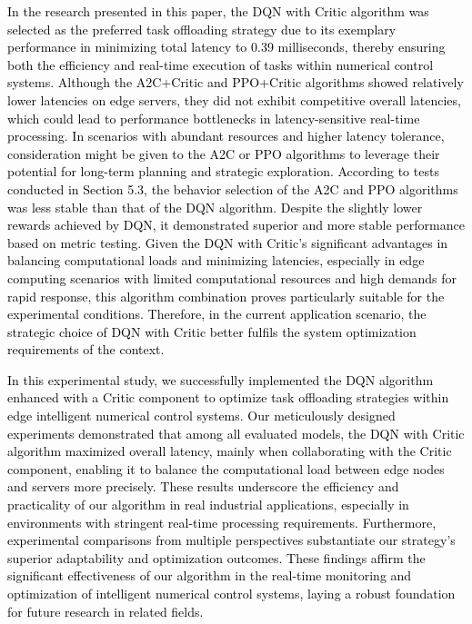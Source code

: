 \documentclass[preprint,12pt]{elsarticle}
\begin{document}
\textcolor{black}{In the research presented in this paper, the DQN with Critic algorithm was selected as the preferred task offloading strategy due to its exemplary performance in minimizing total latency to 0.39 milliseconds, thereby ensuring both the efficiency and real-time execution of tasks within numerical control systems. Although the A2C+Critic and PPO+Critic algorithms showed relatively lower latencies on edge servers, they did not exhibit competitive overall latencies, which could lead to performance bottlenecks in latency-sensitive real-time processing. In scenarios with abundant resources and higher latency tolerance, consideration might be given to the A2C or PPO algorithms to leverage their potential for long-term planning and strategic exploration. According to tests conducted in Section 5.3, the behavior selection of the A2C and PPO algorithms was less stable than that of the DQN algorithm. Despite the slightly lower rewards achieved by DQN, it demonstrated superior and more stable performance based on metric testing. Given the DQN with Critic's significant advantages in balancing computational loads and minimizing latencies, especially in edge computing scenarios with limited computational resources and high demands for rapid response, this algorithm combination proves particularly suitable for the experimental conditions. Therefore, in the current application scenario, the strategic choice of DQN with Critic better fulfils the system optimization requirements of the context.}

\textcolor{black}{In this experimental study, we successfully implemented the DQN algorithm enhanced with a Critic component to optimize task offloading strategies within edge intelligent numerical control systems. Our meticulously designed experiments demonstrated that among all evaluated models, the DQN with Critic algorithm maximized overall latency, mainly when collaborating with the Critic component, enabling it to balance the computational load between edge nodes and servers more precisely. These results underscore the efficiency and practicality of our algorithm in real industrial applications, especially in environments with stringent real-time processing requirements. Furthermore, experimental comparisons from multiple perspectives substantiate our strategy's superior adaptability and optimization outcomes. These findings affirm the significant effectiveness of our algorithm in the real-time monitoring and optimization of intelligent numerical control systems, laying a robust foundation for future research in related fields.}
\end{document}
